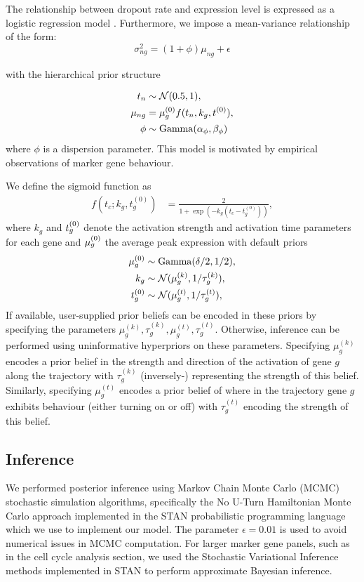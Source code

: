 The relationship between dropout rate and expression level is expressed as a logistic regression model \cite{Kharchenko2014}. Furthermore, we impose a mean-variance relationship of the form:
\begin{equation}
\sigma^2_{ng}  = (1 + \phi) \mu_{ng} + \epsilon
\end{equation}

with the hierarchical prior structure

\begin{align}
	t_n &\sim \mathcal{N}(0.5, 1), \\
	\mu_{ng} & =  \mu^{(0)}_g f(t_n, k_g, t^{(0)}), \\
	\phi & \sim \mathrm{Gamma}(\alpha_\phi, \beta_\phi)
\end{align}
where $\phi$ is a dispersion parameter. This model is motivated by empirical observations of marker gene behaviour.

We define the sigmoid function as
\begin{align}
	f(t_c;k_g,t^{(0)}_g) &= \frac{2}{1 + \exp\left(-k_g(t_c - t^{(0)}_g)\right)},
\end{align}
where $k_g$ and $t^{(0)}_g$ denote the activation strength and activation time parameters for each gene and $\mu^{(0)}_g$ the average peak expression
with default priors
\begin{align}
		\mu^{(0)}_g & \sim \mathrm{Gamma}(\delta / 2, 1 / 2), \\
		k_g & \sim \mathcal{N}(\mu^{(k)}_g, 1 / \tau^{(k)}_g), \\
		t^{(0)}_g & \sim \mathcal{N}(\mu^{(t)}_g, 1 / \tau^{(t)}_g),
\end{align}
If available, user-supplied prior beliefs can be encoded in these priors by specifying the parameters $\mu^{(k)}_g, \tau^{(k)}_g, \mu^{(t)}_g, \tau^{(t)}_g$. Otherwise, inference can be performed using uninformative hyperpriors on these parameters. Specifying $\mu^{(k)}_g$ encodes a prior belief in the strength and direction of the activation of gene $g$ along the trajectory with $\tau^{(k)}_g$ (inversely-) representing the strength of this belief. Similarly, specifying $\mu^{(t)}_g$ encodes a prior belief of where in the trajectory gene $g$ exhibits behaviour (either turning on or off) with $\tau^{(t)}_g$ encoding the strength of this belief.

\subsection{Inference}

We performed posterior inference using Markov Chain Monte Carlo (MCMC) stochastic simulation algorithms, specifically the No U-Turn Hamiltonian Monte Carlo approach \cite{homan2014no} implemented in the STAN probabilistic programming language \cite{carpenter2015stan} which we use to implement our model. The parameter $\epsilon = 0.01$ is used to avoid numerical issues in MCMC computation. For larger marker gene panels, such as in the cell cycle analysis section, we used the Stochastic Variational Inference methods implemented in STAN to perform approximate Bayesian inference.




